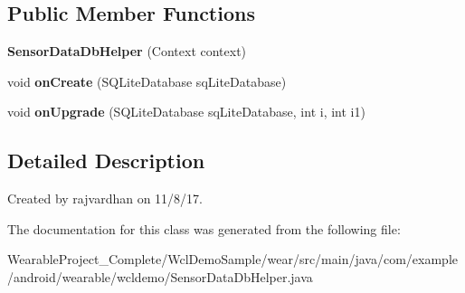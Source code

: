 \subsection*{Public Member Functions}
\begin{DoxyCompactItemize}
\item 
{\bfseries Sensor\+Data\+Db\+Helper} (Context context)\hypertarget{classcom_1_1example_1_1android_1_1wearable_1_1wcldemo_1_1SensorDataDbHelper_ac6d0d11f994825f5a4e392c6c6b9480b}{}\label{classcom_1_1example_1_1android_1_1wearable_1_1wcldemo_1_1SensorDataDbHelper_ac6d0d11f994825f5a4e392c6c6b9480b}

\item 
void {\bfseries on\+Create} (S\+Q\+Lite\+Database sq\+Lite\+Database)\hypertarget{classcom_1_1example_1_1android_1_1wearable_1_1wcldemo_1_1SensorDataDbHelper_afb17dd7e0d1522e4bbaebd859e8c8683}{}\label{classcom_1_1example_1_1android_1_1wearable_1_1wcldemo_1_1SensorDataDbHelper_afb17dd7e0d1522e4bbaebd859e8c8683}

\item 
void {\bfseries on\+Upgrade} (S\+Q\+Lite\+Database sq\+Lite\+Database, int i, int i1)\hypertarget{classcom_1_1example_1_1android_1_1wearable_1_1wcldemo_1_1SensorDataDbHelper_a54f0ce85c5f2441465002e1f60c290d2}{}\label{classcom_1_1example_1_1android_1_1wearable_1_1wcldemo_1_1SensorDataDbHelper_a54f0ce85c5f2441465002e1f60c290d2}

\end{DoxyCompactItemize}


\subsection{Detailed Description}
Created by rajvardhan on 11/8/17. 

The documentation for this class was generated from the following file\+:\begin{DoxyCompactItemize}
\item 
Wearable\+Project\+\_\+\+Complete/\+Wcl\+Demo\+Sample/wear/src/main/java/com/example/android/wearable/wcldemo/Sensor\+Data\+Db\+Helper.\+java\end{DoxyCompactItemize}
